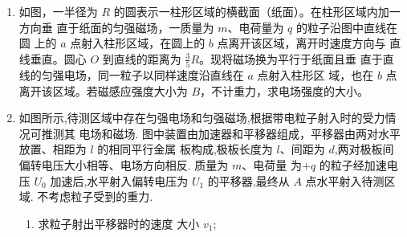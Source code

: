 \begin{enumerate}
\begin{enumerate}
\end{enumerate}
\begin{figure}[h!]
	\flushright
	
\end{figure}





\item 
{}
如图，一半径为 $ R $ 的圆表示一柱形区域的横截面（纸面）。在柱形区域内加一方向垂
直于纸面的匀强磁场，一质量为 $ m $、电荷量为 $ q $ 的粒子沿图中直线在圆
上的 $ a $ 点射入柱形区域，在圆上的 $ b $ 点离开该区域，离开时速度方向与
直线垂直。圆心 $ O $ 到直线的距离为
$  \frac{ 3 }{ 5 } R $。现将磁场换为平行于纸面且垂
直于直线的匀强电场，同一粒子以同样速度沿直线在 $ a $ 点射入柱形区
域，也在 $ b $ 点离开该区域。若磁感应强度大小为 $ B $，不计重力，求电场强度的大小。
\begin{figure}[h!]
	\flushright
	
\end{figure}




\item 
{}
如图所示,待测区域中存在匀强电场和匀强磁场,根据带电粒子射入时的受力情况可推测其
电场和磁场. 图中装置由加速器和平移器组成，平移器由两对水平放置、相距为 $ l $ 的相同平行金属
板构成,极板长度为 $ l $、间距为 $ d $,两对极板间偏转电压大小相等、电场方向相反. 质量为 $ m $、电荷量
为$ +q $ 的粒子经加速电压 $ U_{0} $ 加速后,水平射入偏转电压为 $ U_{1} $ 的平移器,最终从 $ A $ 点水平射入待测区域.
不考虑粒子受到的重力.
\begin{enumerate}
	\item
求粒子射出平移器时的速度
大小 $ v_{1} $;


\end{enumerate}
\end{enumerate}
